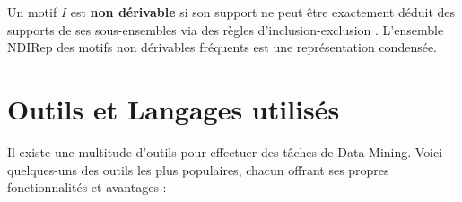 \documentclass[a4paper,14pt]{article}
\begin{document}
        Un motif \( I \) est \textbf{non dérivable} si son support ne peut être exactement déduit des supports de ses sous-ensembles via des règles d’inclusion-exclusion \cite{CG06}. L’ensemble \( \text{NDIRep} \) des motifs non dérivables fréquents est une représentation condensée.
        
        

        


\section{Outils et Langages utilisés}
Il existe une multitude d’outils pour effectuer des tâches de Data Mining. Voici quelques-uns des outils les plus populaires, chacun offrant ses propres fonctionnalités et avantages :
\end{document}
